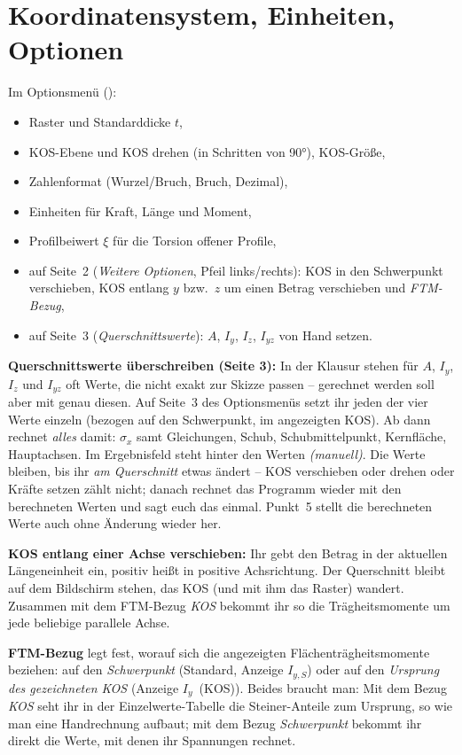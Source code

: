 \section{Koordinatensystem, Einheiten, Optionen}

Im Optionsmenü ():

\begin{itemize}
  \item Raster und Standarddicke $t$,
  \item KOS-Ebene und KOS drehen (in Schritten von 90°), KOS-Größe,
  \item Zahlenformat (Wurzel/Bruch, Bruch, Dezimal),
  \item Einheiten für Kraft, Länge und Moment,
  \item Profilbeiwert $\xi$ für die Torsion offener Profile,
  \item auf Seite~2 (\emph{Weitere Optionen}, Pfeil links/rechts): KOS in den Schwerpunkt
        verschieben, KOS entlang $y$ bzw.\ $z$ um einen Betrag verschieben und \emph{FTM-Bezug},
  \item auf Seite~3 (\emph{Querschnittswerte}): $A$, $I_y$, $I_z$, $I_{yz}$ von Hand setzen.
\end{itemize}

\textbf{Querschnittswerte überschreiben (Seite 3):} In der Klausur stehen für $A$, $I_y$, $I_z$
und $I_{yz}$ oft Werte, die nicht exakt zur Skizze passen -- gerechnet werden soll aber mit genau
diesen. Auf Seite~3 des Optionsmenüs setzt ihr jeden der vier Werte einzeln (bezogen auf den
Schwerpunkt, im angezeigten KOS). Ab dann rechnet \emph{alles} damit: $\sigma_x$ samt Gleichungen,
Schub, Schubmittelpunkt, Kernfläche, Hauptachsen. Im Ergebnisfeld steht hinter den Werten
\emph{(manuell)}. Die Werte bleiben, bis ihr \emph{am Querschnitt} etwas ändert -- KOS verschieben
oder drehen oder Kräfte setzen zählt nicht; danach rechnet das Programm wieder mit den berechneten
Werten und sagt euch das einmal. Punkt~5 stellt die berechneten Werte auch ohne Änderung wieder her.

\textbf{KOS entlang einer Achse verschieben:} Ihr gebt den Betrag in der aktuellen Längeneinheit
ein, positiv heißt in positive Achsrichtung. Der Querschnitt bleibt auf dem Bildschirm stehen,
das KOS (und mit ihm das Raster) wandert. Zusammen mit dem FTM-Bezug \emph{KOS} bekommt ihr so
die Trägheitsmomente um jede beliebige parallele Achse.

\textbf{FTM-Bezug} legt fest, worauf sich die angezeigten Flächenträgheitsmomente beziehen: auf
den \emph{Schwerpunkt} (Standard, Anzeige $I_{y,S}$) oder auf den \emph{Ursprung des gezeichneten
KOS} (Anzeige $I_y$~(KOS)). Beides braucht man: Mit dem Bezug \emph{KOS} seht ihr in der
Einzelwerte-Tabelle die Steiner-Anteile zum Ursprung, so wie man eine Handrechnung aufbaut; mit
dem Bezug \emph{Schwerpunkt} bekommt ihr direkt die Werte, mit denen ihr Spannungen rechnet.

